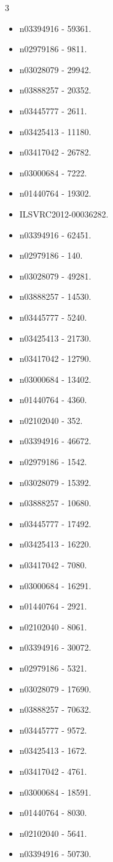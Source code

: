 \begin{multicols}{3}
\begin{itemize}
\item n03394916 - 59361.
\item n02979186 - 9811.
\item n03028079 - 29942.
\item n03888257 - 20352.
\item n03445777 - 2611.
\item n03425413 - 11180.
\item n03417042 - 26782.
\item n03000684 - 7222.
\item n01440764 - 19302.
\item ILSVRC2012-00036282.
\item n03394916 - 62451.
\item n02979186 - 140.
\item n03028079 - 49281.
\item n03888257 - 14530.
\item n03445777 - 5240.
\item n03425413 - 21730.
\item n03417042 - 12790.
\item n03000684 - 13402.
\item n01440764 - 4360.
\item n02102040 - 352.
\item n03394916 - 46672.
\item n02979186 - 1542.
\item n03028079 - 15392.
\item n03888257 - 10680.
\item n03445777 - 17492.
\item n03425413 - 16220.
\item n03417042 - 7080.
\item n03000684 - 16291.
\item n01440764 - 2921.
\item n02102040 - 8061.
\item n03394916 - 30072.
\item n02979186 - 5321.
\item n03028079 - 17690.
\item n03888257 - 70632.
\item n03445777 - 9572.
\item n03425413 - 1672.
\item n03417042 - 4761.
\item n03000684 - 18591.
\item n01440764 - 8030.
\item n02102040 - 5641.
\item n03394916 - 50730.

\end{itemize}
\end{multicols}
